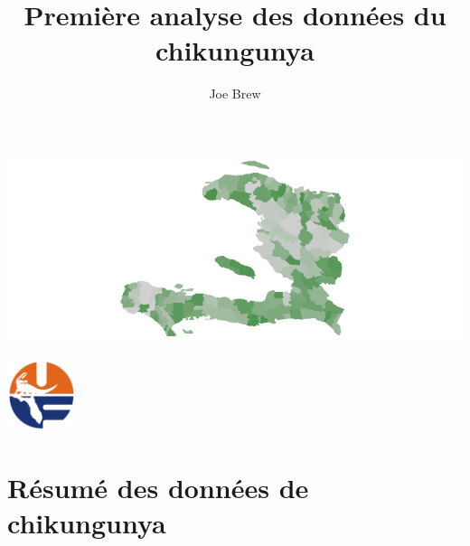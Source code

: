 \documentclass[11pt]{article}
\begin{document}




\title{\textbf{Première analyse des données du chikungunya}}
\author{Joe Brew}


\maketitle

\begin{center}
\includegraphics{chik_analyse_pour_madsen-002}
\end{center}

\tableofcontents


\begin{center}
\includegraphics[width=2cm]{uf}
\end{center}



\section*{Résumé des données de chikungunya}
\hrulefill
\end{document}
